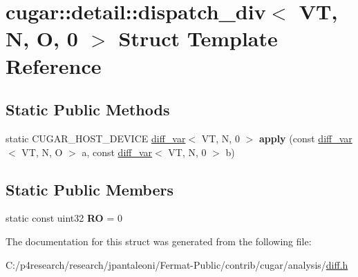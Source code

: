 \hypertarget{structcugar_1_1detail_1_1dispatch__div_3_01_v_t_00_01_n_00_01_o_00_010_01_4}{}\section{cugar\+:\+:detail\+:\+:dispatch\+\_\+div$<$ VT, N, O, 0 $>$ Struct Template Reference}
\label{structcugar_1_1detail_1_1dispatch__div_3_01_v_t_00_01_n_00_01_o_00_010_01_4}
\subsection*{Static Public Methods}
\begin{DoxyCompactItemize}
\item 
\mbox{\label{structcugar_1_1detail_1_1dispatch__div_3_01_v_t_00_01_n_00_01_o_00_010_01_4_adc327b90b895aaf6166e537f85cc7bb1}} 
static C\+U\+G\+A\+R\+\_\+\+H\+O\+S\+T\+\_\+\+D\+E\+V\+I\+CE \hyperlink{structcugar_1_1diff__var}{diff\+\_\+var}$<$ VT, N, 0 $>$ {\bfseries apply} (const \hyperlink{structcugar_1_1diff__var}{diff\+\_\+var}$<$ VT, N, O $>$ a, const \hyperlink{structcugar_1_1diff__var}{diff\+\_\+var}$<$ VT, N, 0 $>$ b)
\end{DoxyCompactItemize}
\subsection*{Static Public Members}
\begin{DoxyCompactItemize}
\item 
\mbox{\label{structcugar_1_1detail_1_1dispatch__div_3_01_v_t_00_01_n_00_01_o_00_010_01_4_a742165ca46df33256ca338032bdf9354}} 
static const uint32 {\bfseries RO} = 0
\end{DoxyCompactItemize}


The documentation for this struct was generated from the following file\+:\begin{DoxyCompactItemize}
\item 
C\+:/p4research/research/jpantaleoni/\+Fermat-\/\+Public/contrib/cugar/analysis/\hyperlink{diff_8h}{diff.\+h}\end{DoxyCompactItemize}
